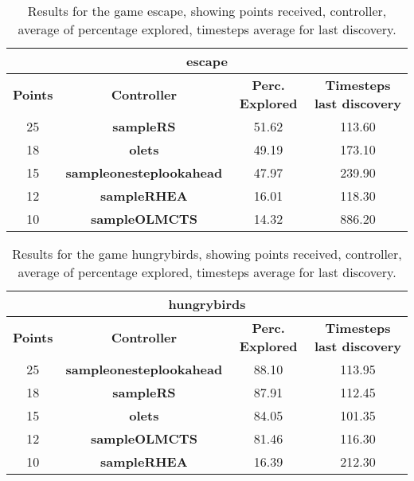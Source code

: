 \begin{table*}[!t]
\begin{center}
\begin{tabular}{|c|c|c|c|}
\multicolumn{4}{c}{\textbf{escape}}\\
\hline
\textbf{Points} & \textbf{Controller} & \textbf{Perc. Explored} &  \textbf{Timesteps last discovery}\\
\hline
25 & \textbf{sampleRS} & 51.62 & 113.60
 \\
\hline
18 & \textbf{olets} & 49.19 & 173.10
 \\
\hline
15 & \textbf{sampleonesteplookahead} & 47.97 & 239.90
 \\
\hline
12 & \textbf{sampleRHEA} & 16.01 & 118.30
 \\
\hline
10 & \textbf{sampleOLMCTS} & 14.32 & 886.20
 \\
\hline
\end{tabular}
\caption{Results for the game escape, showing points received, controller, average of percentage explored, timesteps average for last discovery.}
\label{tab:weights}
\end{center}
\end{table*}
\begin{table*}[!t]
\begin{center}
\begin{tabular}{|c|c|c|c|}
\multicolumn{4}{c}{\textbf{hungrybirds}}\\
\hline
\textbf{Points} & \textbf{Controller} & \textbf{Perc. Explored} &  \textbf{Timesteps last discovery}\\
\hline
25 & \textbf{sampleonesteplookahead} & 88.10 & 113.95
 \\
\hline
18 & \textbf{sampleRS} & 87.91 & 112.45
 \\
\hline
15 & \textbf{olets} & 84.05 & 101.35
 \\
\hline
12 & \textbf{sampleOLMCTS} & 81.46 & 116.30
 \\
\hline
10 & \textbf{sampleRHEA} & 16.39 & 212.30
 \\
\hline
\end{tabular}
\caption{Results for the game hungrybirds, showing points received, controller, average of percentage explored, timesteps average for last discovery.}
\label{tab:weights}
\end{center}
\end{table*}
